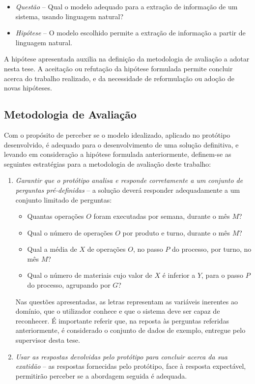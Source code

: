 \begin{itemize}
    \item
    {  
        \textit{Questão} -- Qual o modelo adequado para a extração de informação de um sistema, usando linguagem natural?
    }
    \item
    {
        \textit{Hipótese} -- O modelo escolhido permite a extração de informação a partir de linguagem natural.
    }
\end{itemize}

A hipótese apresentada auxilia na definição da metodologia de avaliação a adotar nesta tese. A aceitação ou refutação da hipótese formulada permite concluir acerca do trabalho realizado, e da necessidade de reformulação ou adoção de novas hipóteses.

\subsection{Metodologia de Avaliação}
Com o propósito de perceber se o modelo idealizado, aplicado no protótipo desenvolvido, é adequado para o desenvolvimento de uma solução definitiva, e levando em consideração a hipótese formulada anteriormente, definem-se as seguintes estratégias para a metodologia de avaliação deste trabalho:

\begin{enumerate}
    \item 
    {
        \textit{Garantir que o protótipo analisa e responde corretamente a um conjunto de perguntas pré-definidas} -- a solução deverá responder adequadamente a um conjunto limitado de perguntas:
        \begin{itemize}
            \item 
            {
                Quantas operações $O$ foram executadas por semana, durante o mês $M$?
            }
            \item
            {
                Qual o número de operações $O$ por produto e turno, durante o mês $M$?
            }
            \item
            {
                Qual a média de $X$ de operações $O$, no passo $P$ do processo, por turno, no mês $M$? 
            }
            \item
            {
                Qual o número de materiais cujo valor de $X$ é inferior a $Y$, para o passo $P$ do processo, agrupando por $G$?
            }
        \end{itemize}
        
        Nas questões apresentadas, as letras representam as variáveis inerentes ao domínio, que o utilizador conhece e que o sistema deve ser capaz de reconhecer. É importante referir que, na reposta às perguntas referidas anteriormente, é considerado o conjunto de dados de exemplo, entregue pelo supervisor desta tese.
    }
    \item
    {
        \textit{Usar as respostas devolvidas pelo protótipo para concluir acerca da sua exatidão} -- as respostas fornecidas pelo protótipo, face à resposta expectável, permitirão perceber se a abordagem seguida é adequada.
    }
\end{enumerate}

